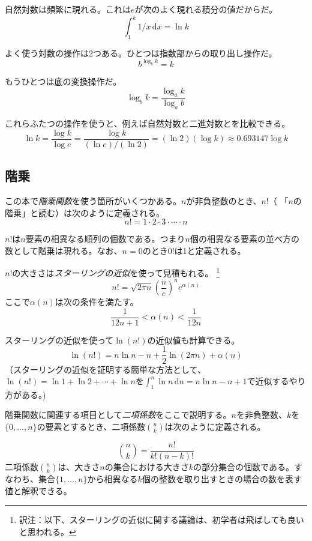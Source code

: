 自然対数は頻繁に現れる。これは$e$が次のよく現れる積分の値だからだ。
\[
    \int_{1}^{k} 1/x\,\mathrm{d}x  = \ln k
\]

よく使う対数の操作は2つある。ひとつは指数部からの取り出し操作だ。
\[
    b^{\log_b k} = k
\]

もうひとつは底の変換操作だ。
\[
    \log_b k = \frac{\log_a k}{\log_a b}
\]

これらふたつの操作を使うと、例えば自然対数と二進対数とを比較できる。
\[
   \ln k = \frac{\log k}{\log e} = \frac{\log k}{(\ln e)/(\ln 2)} =
    (\ln 2)(\log k) \approx 0.693147\log k
\]

\subsection{階乗}

この本で\emph{階乗関数}を使う箇所がいくつかある。$n$が非負整数のとき、$n!$（ 「$n$の階乗」と読む）は次のように定義される。
\[
   n! = 1\cdot2\cdot3\cdot\cdots\cdot n
\]

$n!$は$n$要素の相異なる順列の個数である。つまり$n$個の相異なる要素の並べ方の数として階乗は現れる。なお、$n=0$のとき$0!$は1と定義される。

%
$n!$の大きさは\emph{スターリングの近似}を使って見積もれる。
\footnote{訳注：以下、スターリングの近似に関する議論は、初学者は飛ばしても良いと思われる。}
\[
  n!
   = \sqrt{2\pi n}\left(\frac{n}{e}\right)^{n}e^{\alpha(n)}
\]
ここで$\alpha(n)$は次の条件を満たす。
\[
   \frac{1}{12n+1} <  \alpha(n) < \frac{1}{12n}
\]

スターリングの近似を使って$\ln(n!)$の近似値も計算できる。
\[
   \ln(n!) = n\ln n - n + \frac{1}{2}\ln(2\pi n) + \alpha(n)
\]
（スターリングの近似を証明する簡単な方法として、$\ln(n!)=\ln 1 + \ln 2  + \cdots + \ln n$を$\int_1^n \ln n\,\mathrm{d}n = n\ln n - n +1$で近似するやり方がある。)

%
階乗関数に関連する項目として\emph{二項係数}をここで説明する。$n$を非負整数、$k$を$\{0,\ldots,n\}$の要素とするとき、二項係数$\binom{n}{k}$は次のように定義される。

\[
   \binom{n}{k} = \frac{n!}{k!(n-k)!}
\]
二項係数$\binom{n}{k}$は、大きさ$n$の集合における大きさ$k$の部分集合の個数である。すなわち、集合$\{1,\ldots,n\}$から相異なる$k$個の整数を取り出すときの場合の数を表す値と解釈できる。 %

